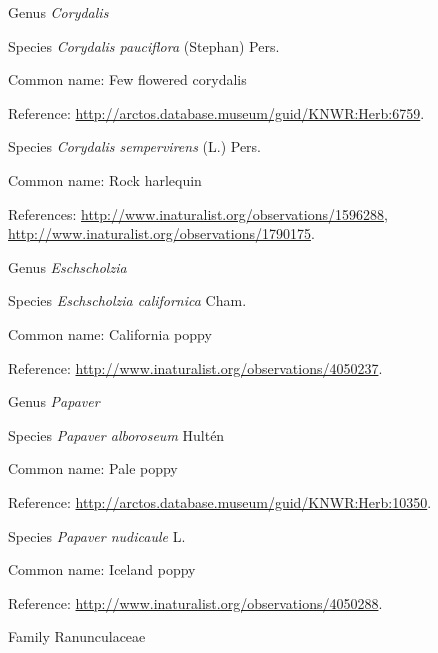 \documentclass[9pt, article]{memoir}
\begin{document}
\begin{multicols}{2}
\vspace{6pt}\noindent\hspace{30pt}Genus \textit{Corydalis}


\vspace{6pt}\noindent\hspace{36pt}Species \textit{Corydalis pauciflora} (Stephan) Pers.


Common name: Few flowered corydalis

Reference: 
\url{http://arctos.database.museum/guid/KNWR:Herb:6759}.

\vspace{6pt}\noindent\hspace{36pt}Species \textit{Corydalis sempervirens} (L.) Pers.


Common name: Rock harlequin

References: 
\url{http://www.inaturalist.org/observations/1596288}, 
\url{http://www.inaturalist.org/observations/1790175}.

\vspace{6pt}\noindent\hspace{30pt}Genus \textit{Eschscholzia}


\vspace{6pt}\noindent\hspace{36pt}Species \textit{Eschscholzia californica} Cham.


Common name: California poppy

Reference: 
\url{http://www.inaturalist.org/observations/4050237}.

\vspace{6pt}\noindent\hspace{30pt}Genus \textit{Papaver}


\vspace{6pt}\noindent\hspace{36pt}Species \textit{Papaver alboroseum} Hultén


Common name: Pale poppy

Reference: 
\url{http://arctos.database.museum/guid/KNWR:Herb:10350}.

\vspace{6pt}\noindent\hspace{36pt}Species \textit{Papaver nudicaule} L.


Common name: Iceland poppy

Reference: 
\url{http://www.inaturalist.org/observations/4050288}.

\vspace{6pt}\noindent\hspace{24pt}Family Ranunculaceae



\end{multicols}
\end{document}
